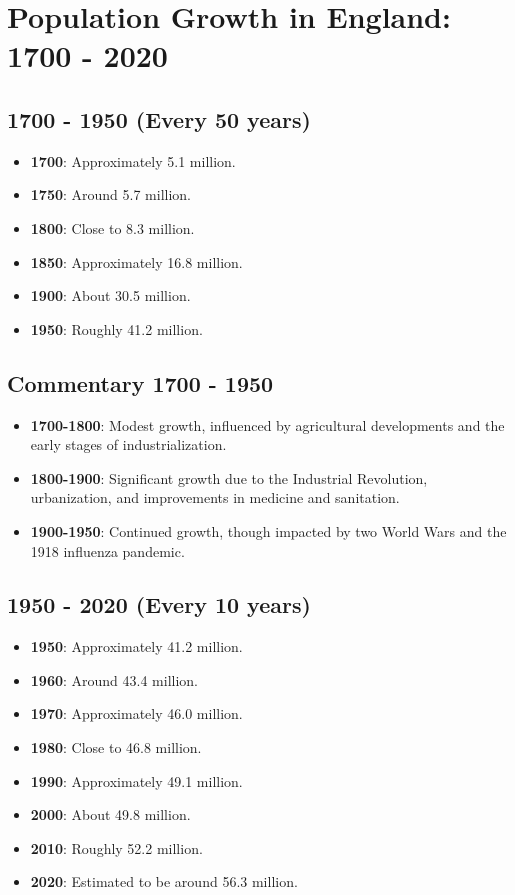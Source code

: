 \section*{Population Growth in England: 1700 - 2020}

\subsection*{1700 - 1950 (Every 50 years)}
\begin{itemize}
    \item \textbf{1700}: Approximately 5.1 million.
    \item \textbf{1750}: Around 5.7 million.
    \item \textbf{1800}: Close to 8.3 million.
    \item \textbf{1850}: Approximately 16.8 million.
    \item \textbf{1900}: About 30.5 million.
    \item \textbf{1950}: Roughly 41.2 million.
\end{itemize}

\subsection*{Commentary 1700 - 1950}
\begin{itemize}
    \item \textbf{1700-1800}: Modest growth, influenced by agricultural developments and the early stages of industrialization.
    \item \textbf{1800-1900}: Significant growth due to the Industrial Revolution, urbanization, and improvements in medicine and sanitation.
    \item \textbf{1900-1950}: Continued growth, though impacted by two World Wars and the 1918 influenza pandemic.
\end{itemize}

\subsection*{1950 - 2020 (Every 10 years)}
\begin{itemize}
    \item \textbf{1950}: Approximately 41.2 million.
    \item \textbf{1960}: Around 43.4 million.
    \item \textbf{1970}: Approximately 46.0 million.
    \item \textbf{1980}: Close to 46.8 million.
    \item \textbf{1990}: Approximately 49.1 million.
    \item \textbf{2000}: About 49.8 million.
    \item \textbf{2010}: Roughly 52.2 million.
    \item \textbf{2020}: Estimated to be around 56.3 million.
\end{itemize}

